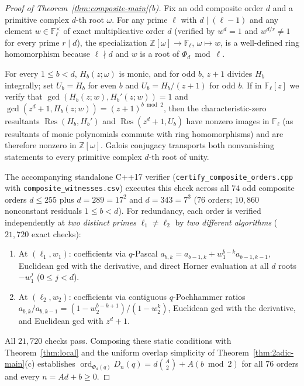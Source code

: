 \documentclass[11pt,reqno]{amsart}
\numberwithin{equation}{section}
\theoremstyle{definition}
\theoremstyle{remark}
\newcommand{\Z}{\mathbb{Z}}
\newcommand{\F}{\mathbb{F}}
\newcommand{\Res}{\operatorname{Res}}
\newcommand{\ord}{\operatorname{ord}}
\begin{document}
\begin{proof}[Proof of Theorem~\ref{thm:composite-main}(b)]
Fix an odd composite order $d$ and a primitive complex $d$-th root $\omega$. For any prime $\ell$ with $d\mid (\ell-1)$ and any element $w\in\F_\ell^\times$ of exact multiplicative order $d$ (verified by $w^d=1$ and $w^{d/r}\neq 1$ for every prime $r\mid d$), the specialization $\Z[\omega]\to\F_\ell$, $\omega\mapsto w$, is a well-defined ring homomorphism because $\ell\nmid d$ and $w$ is a root of $\Phi_d\bmod\ell$.

For every $1\le b<d$, $H_b(z;\omega)$ is monic, and for odd $b$, $z+1$ divides $H_b$ integrally; set $U_b=H_b$ for even $b$ and $U_b=H_b/(z+1)$ for odd $b$. If in $\F_\ell[z]$ we verify that $\gcd(H_b(z;w), H_b'(z;w))=1$ and $\gcd(z^d+1,H_b(z;w))=(z+1)^{b\bmod 2}$, then the characteristic-zero resultants $\Res(H_b,H_b')$ and $\Res(z^d+1,U_b)$ have nonzero images in $\F_\ell$ (as resultants of monic polynomials commute with ring homomorphisms) and are therefore nonzero in $\Z[\omega]$. Galois conjugacy transports both nonvanishing statements to every primitive complex $d$-th root of unity.

The accompanying standalone C++17 verifier (\texttt{certify\_composite\_orders.cpp} with \texttt{composite\_witnesses.csv}) executes this check across all $74$ odd composite orders $d\le 255$ plus $d=289=17^2$ and $d=343=7^3$ ($76$ orders; $10{,}860$ nonconstant residuals $1\le b<d$). For redundancy, each order is verified independently at \emph{two distinct primes} $\ell_1\neq\ell_2$ by \emph{two different algorithms} ($21{,}720$ exact checks):
\begin{enumerate}[label=(\arabic*),leftmargin=2em]
\item At $(\ell_1,w_1)$: coefficients via $q$-Pascal $a_{b,k}=a_{b-1,k}+w_1^{b-k}a_{b-1,k-1}$, Euclidean gcd with the derivative, and direct Horner evaluation at all $d$ roots $-w_1^j$ ($0\le j<d$).
\item At $(\ell_2,w_2)$: coefficients via contiguous $q$-Pochhammer ratios $a_{b,k}/a_{b,k-1}=(1-w_2^{b-k+1})/(1-w_2^k)$, Euclidean gcd with the derivative, and Euclidean gcd with $z^d+1$.
\end{enumerate}
All $21{,}720$ checks pass. Composing these static conditions with Theorem~\ref{thm:local} and the uniform overlap simplicity of Theorem~\ref{thm:2adic-main}(c) establishes $\ord_{\Phi_d(q)}D_n(q) = d\binom{A}{2}+A(b\bmod 2)$ for all $76$ orders and every $n=Ad+b\ge 0$.
\end{proof}
\end{document}
